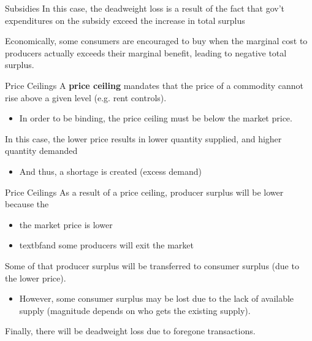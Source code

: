 \documentclass{beamer}
\begin{document}
\begin{frame}{Subsidies}
  In this case, the deadweight loss is a result of the fact that gov't expenditures on the subsidy exceed the increase in total surplus

  \bigskip
  Economically, some consumers are encouraged to buy when the marginal cost to producers actually exceeds their marginal benefit, leading to negative total surplus.
\end{frame}

\begin{frame}{Price Ceilings}
  A \textbf{price ceiling} mandates that the price of a commodity cannot rise above a given level (e.g. rent controls).

  \begin{itemize}
    \item In order to be binding, the price ceiling must be below the market price.
  \end{itemize}

  \bigskip
  In this case, the lower price results in lower quantity supplied, and higher quantity demanded

  \begin{itemize}
    \item And thus, a shortage is created (excess demand)
  \end{itemize}
\end{frame}

\begin{frame}{Price Ceilings}
  As a result of a price ceiling, producer surplus will be lower because the 
  \begin{itemize}
    \item the market price is lower 
    \item textbf{and} some producers will exit the market
  \end{itemize}

  \bigskip
  Some of that producer surplus will be transferred to consumer surplus (due to the lower price).

  \begin{itemize}
    \item However, some consumer surplus may be lost due to the lack of available supply (magnitude depends on who gets the existing supply).
  \end{itemize}

  \bigskip
  Finally, there will be deadweight loss due to foregone transactions.
\end{frame}
\end{document}
